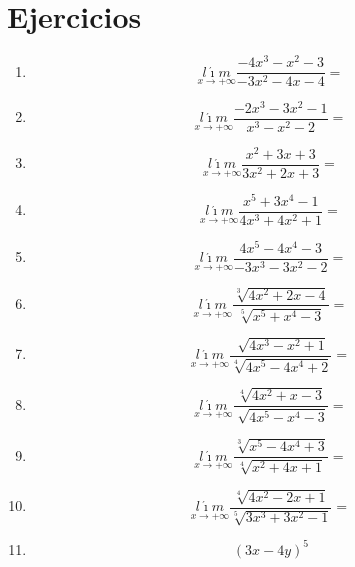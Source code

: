 \documentclass[oneside,spanish,letter]{article}
\begin{document}
\section{Ejercicios}
\begin{enumerate}
 \item $$\underset{x\rightarrow +\infty}{l\acute{\imath}m} \frac{-4x^3-x^2-3}{-3x^2-4x-4}=$$
 \item $$\underset{x\rightarrow +\infty}{l\acute{\imath}m} \frac{-2x^3-3x^2-1}{x^3-x^2-2}=$$
 \item $$\underset{x\rightarrow +\infty}{l\acute{\imath}m} \frac{x^2+3x+3}{3x^2+2x+3}=$$
 \item $$\underset{x\rightarrow +\infty}{l\acute{\imath}m} \frac{x^5+3x^4-1}{4x^3+4x^2+1}=$$
 \item $$\underset{x\rightarrow +\infty}{l\acute{\imath}m} \frac{4x^5-4x^4-3}{-3x^3-3x^2-2}=$$
 \item $$\underset{x\rightarrow +\infty}{l\acute{\imath}m} \frac{\sqrt[3]{4x^2+2x-4}}{\sqrt[5]{x^5+x^4-3}}=$$
 \item $$\underset{x\rightarrow +\infty}{l\acute{\imath}m} \frac{\sqrt[]{4x^3-x^2+1}}{\sqrt[4]{4x^5-4x^4+2}}=$$
 \item $$\underset{x\rightarrow +\infty}{l\acute{\imath}m} \frac{\sqrt[4]{4x^2+x-3}}{\sqrt[]{4x^5-x^4-3}}=$$
 \item $$\underset{x\rightarrow +\infty}{l\acute{\imath}m} \frac{\sqrt[3]{x^5-4x^4+3}}{\sqrt[4]{x^2+4x+1}}=$$
 \item $$\underset{x\rightarrow +\infty}{l\acute{\imath}m} \frac{\sqrt[4]{4x^2-2x+1}}{\sqrt[5]{3x^3+3x^2-1}}=$$
\item $$(3x-4y)^5$$
 \end{enumerate}
  \newpage
\end{document}
